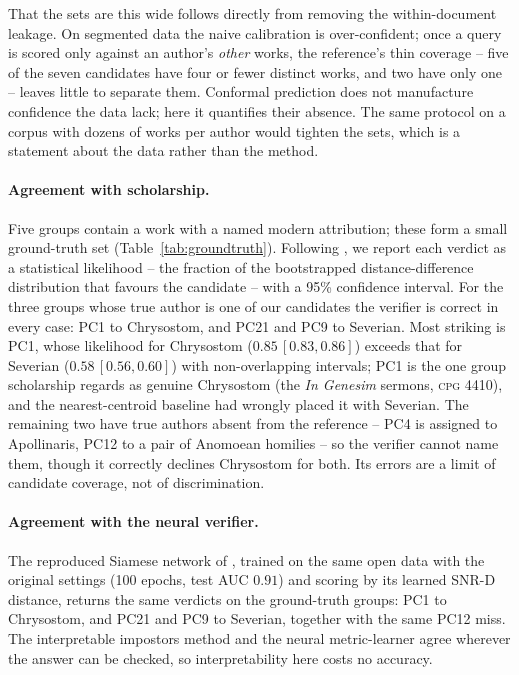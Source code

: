 \documentclass{anthology-ch}
\begin{document}
That the sets are this wide follows directly from removing the within-document leakage. On segmented data the naive calibration is over-confident; once a query is scored only against an author's \emph{other} works, the reference's thin coverage -- five of the seven candidates have four or fewer distinct works, and two have only one -- leaves little to separate them. Conformal prediction does not manufacture confidence the data lack; here it quantifies their absence. The same protocol on a corpus with dozens of works per author would tighten the sets, which is a statement about the data rather than the method.

\begin{table}[t]
  \centering
  \small
  
  \caption{Conformal $90\%$ prediction sets for selected pseudo-Chrysostom groups under document-grouped calibration. The sets are wide -- the method ranks candidates rather than naming one -- but where scholarship supplies a candidate in the room (PC9, PC21, PC1) the set contains it.}
  \label{tab:conformal}
\end{table}

\paragraph{Agreement with scholarship.} Five groups contain a work with a named modern attribution; these form a small ground-truth set (Table~\ref{tab:groundtruth}). Following \textcite{nagy2024}, we report each verdict as a statistical likelihood -- the fraction of the bootstrapped distance-difference distribution that favours the candidate -- with a 95\% confidence interval. For the three groups whose true author is one of our candidates the verifier is correct in every case: PC1 to Chrysostom, and PC21 and PC9 to Severian. Most striking is PC1, whose likelihood for Chrysostom ($0.85\,[0.83,0.86]$) exceeds that for Severian ($0.58\,[0.56,0.60]$) with non-overlapping intervals; PC1 is the one group scholarship regards as genuine Chrysostom (the \emph{In Genesim} sermons, \textsc{cpg} 4410), and the nearest-centroid baseline had wrongly placed it with Severian. The remaining two have true authors absent from the reference -- PC4 is assigned to Apollinaris, PC12 to a pair of Anomoean homilies \cite{liebaert1969} -- so the verifier cannot name them, though it correctly declines Chrysostom for both. Its errors are a limit of candidate coverage, not of discrimination.

\paragraph{Agreement with the neural verifier.} The reproduced Siamese network of \textcite{clerice2023}, trained on the same open data with the original settings (100 epochs, test AUC $0.91$) and scoring by its learned SNR-D distance, returns the same verdicts on the ground-truth groups: PC1 to Chrysostom, and PC21 and PC9 to Severian, together with the same PC12 miss. The interpretable impostors method and the neural metric-learner agree wherever the answer can be checked, so interpretability here costs no accuracy.
\end{document}
